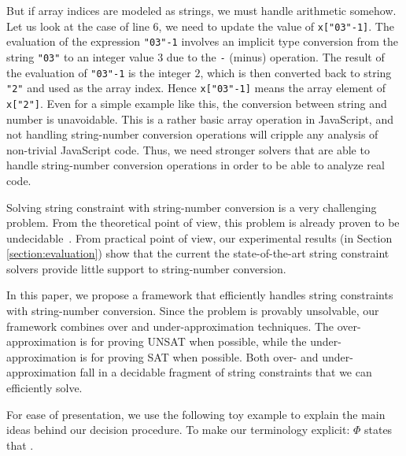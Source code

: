 \documentclass[sigplan,screen]{acmart}
\begin{document}
But if array indices are modeled as strings, we must handle arithmetic somehow. Let us look at the case of line 6, we need to update the value of \texttt{x["03"-1]}. The evaluation of the expression \texttt{"03"-1} involves an implicit type conversion from the string \texttt{"03"} to an integer value $3$ due to the \texttt{-} (minus) operation. The result of the evaluation of \texttt{"03"-1} is the integer $2$, which is then converted back to string \texttt{"2"} and used as the array index. Hence \texttt{x["03"-1]} means the array element of \texttt{x["2"]}. Even for a simple example like this, the conversion between string and number is unavoidable. This is a rather basic   array operation in JavaScript, and not  handling string-number conversion operations will cripple any analysis of non-trivial JavaScript code. Thus, we need stronger solvers that are  able to handle string-number conversion operations in order to be able to analyze  real code. 















Solving string constraint with string-number conversion is a very challenging problem. From the theoretical point of view, this problem is already proven to be undecidable~\cite{day2018satisfiability}. From practical point of view, 
 our experimental results  (in Section \ref{section:evaluation}) show that the current  the state-of-the-art string constraint solvers provide little support to string-number conversion. 


In this paper, we propose a framework that efficiently handles string constraints with string-number conversion. Since the problem is provably unsolvable, our framework combines over and under-approximation techniques. The over-approximation is for proving UNSAT when possible, while the under-approximation is for proving SAT when possible. Both over- and under-approximation fall in a decidable fragment of string constraints that  we can efficiently solve. 


For ease of presentation, we  use the following toy example 
to explain the main ideas behind our decision procedure.  To make our terminology explicit: $\Phi$ states that .
\end{document}
